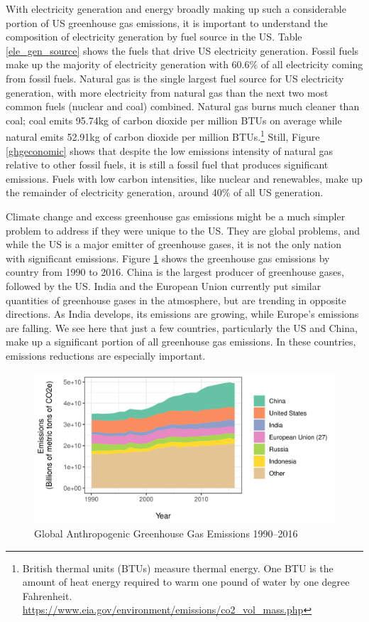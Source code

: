 With electricity generation and energy broadly making up such a considerable portion of US greenhouse gas emissions, it is important to understand the composition of electricity generation by fuel source in the US. Table \ref{ele_gen_source} shows the fuels that drive US electricity generation. Fossil fuels make up the majority of electricity generation with 60.6\% of all electricity coming from fossil fuels. Natural gas is the single largest fuel source for US electricity generation, with more electricity from natural gas than the next two most common fuels (nuclear and coal) combined. Natural gas burns much cleaner than coal; coal emits 95.74kg of carbon dioxide per million BTUs on average while natural emits 52.91kg of carbon dioxide per million BTUs.\footnote{British thermal units (BTUs) measure thermal energy. One BTU is the amount of heat energy required to warm one pound of water by one degree Fahrenheit. \url{https://www.eia.gov/environment/emissions/co2_vol_mass.php}} Still, Figure \ref{ghgeconomic} shows that despite the low emissions intensity of natural gas relative to other fossil fuels, it is still a fossil fuel that produces significant emissions. Fuels with low carbon intensities, like nuclear and renewables, make up the remainder of electricity generation, around 40\% of all US generation.

Climate change and excess greenhouse gas emissions might be a much simpler problem to address if they were unique to the US. They are global problems, and while the US is a major emitter of greenhouse gases, it is not the only nation with significant emissions. Figure \ref{global_ghg} shows the greenhouse gas emissions by country from 1990 to 2016. China is the largest producer of greenhouse gases, followed by the US. India and the European Union currently put similar quantities of greenhouse gases in the atmosphere, but are trending in opposite directions. As India develops, its emissions are growing, while Europe's emissions are falling. We see here that just a few countries, particularly the US and China, make up a significant portion of all greenhouse gas emissions. In these countries, emissions reductions are especially important. 

\begin{figure}
\caption{Global Anthropogenic Greenhouse Gas Emissions 1990--2016 \label{global_ghg}}
\centering
\includegraphics[scale=1]{figures/chapter1_figures/ghg_international.png}
\end{figure}

